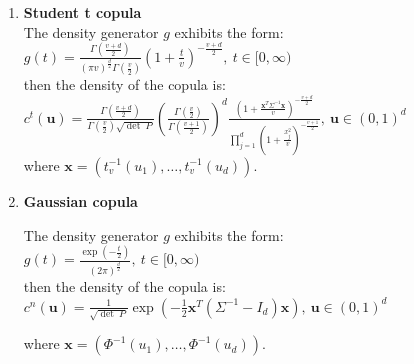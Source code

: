 \documentclass[12pt]{report}
\newcommand{\1}{\mathbf{1}}
\begin{document}
\begin{enumerate}
\item \textbf{Student t copula} \textit{\normalfont\parencite{HofertBook}} \\

The density generator $g$ exhibits the form:\\
\vspace{0.5cm}
$g(t) = \frac{\Gamma(\frac{v+d}{2})}{(\pi v)^{\frac{d}{2}}\Gamma(\frac{v}{2})} \left( 1+\frac{t}{v} \right) ^{-\frac{v+d}{2}}, \: t \in [0,\infty)$ \\
\vspace{0.5cm}
then the density of the copula is:\\
\vspace{0.5cm}
$ c^{t}(\boldsymbol{u}) = \frac{\Gamma(\frac{v+d}{2})}{\Gamma(\frac{v}{2})\sqrt{\det \: P}} \left( \frac{\Gamma(\frac{v}{2})}{\Gamma(\frac{v+1}{2})} \right)^{d} \frac{ (1 + \frac{\boldsymbol{x}^{T}\Sigma^{-1}\boldsymbol{x}}{v})^{-\frac{v+d}{2}}}{\prod_{j = 1}^{d} (1 + \frac{x_{j}^{2}}{v})^{-\frac{v+1}{2}}} , \: \boldsymbol{u} \in (0,1)^{d}$ \\
\vspace{0.5cm}
where $\boldsymbol{x} = (t^{-1}_{v}(u_{1}), \dots, t^{-1}_{v}(u_{d}))$.\\

\item \textbf{Gaussian copula} \parencite{HofertBook} \\ 
\vspace{0.5cm}

The density generator $g$ exhibits the form:\\
\vspace{0.5cm}
$g(t) = \frac{\exp(-\frac{t}{2})}{(2\pi)^{\frac{d}{2}}}, \: t \in [0,\infty)$ \\
\vspace{0.5cm}
then the density of the copula is:\\
\vspace{0.5cm}
$ c^{n}(\boldsymbol{u}) = \frac{1}{\sqrt{\det \: P}} \exp \left(-\frac{1}{2}\boldsymbol{x}^{T}(\Sigma^{-1}-I_{d})\boldsymbol{x} \right), \: \boldsymbol{u} \in (0,1)^{d}$ \\
\vspace{0.5cm}

where $\boldsymbol{x} = (\Phi^{-1}(u_{1}), \dots, \Phi^{-1}(u_{d}))$.\\

\end{enumerate}
\end{document}
